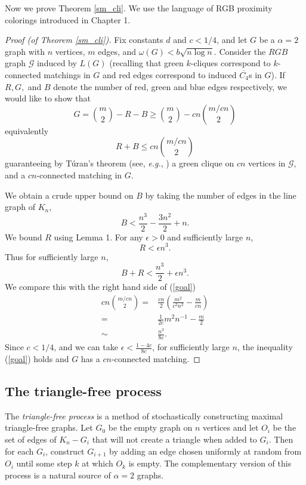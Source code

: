 Now we prove Theorem \ref{sm_cli}.  We use the language of RGB proximity colorings introduced in Chapter 1. 

\begin{proof}[Proof (of Theorem \ref{sm_cli})]
Fix constants $d$ and $c < 1/4$, and let $G$ be a $\alpha = 2$ graph with $n$ vertices, $m$ edges, and $\omega(G) < b\sqrt{n\log n}$.  
%
Consider the $RGB$ graph $\mathcal{G}$ induced by $L(G)$ (recalling that green $k$-cliques correspond to $k$-connected matchings in $G$ and red edges correspond to induced $\overline{C_4}$s in $G$).
%
If $R, G,$ and $B$ denote the number of red, green and blue edges respectively, we would like to show that 
\begin{equation}
G = {m\choose 2} - R - B \geq {m\choose 2} - cn{m/cn\choose 2}
\end{equation} equivalently
\begin{equation}
	R + B \leq cn{m/cn\choose 2}\label{goal}
\end{equation}
guaranteeing by T\'{u}ran's theorem (see, \textit{e.g.}, \cite{dwest}) a green clique on $cn$ vertices in $\mathcal{G}$, and a $cn$-connected matching in $G$.

We obtain a crude upper bound on $B$ by taking the number of edges in the line graph of $K_n$,
\begin{equation}
	B < \frac{n^3}{2} - \frac{3n^2}{2} + n.
\end{equation}
We bound $R$ using Lemma 1.  For any $\epsilon > 0$ and sufficiently large $n$, 
\begin{equation}
R < \epsilon n^3.
\end{equation}
Thus for sufficiently large $n$,
\begin{equation}
	B+R < \frac{n^3}{2} + \epsilon n^3.
\end{equation}
We compare this with the right hand side of (\ref{goal})
\begin{eqnarray}
	cn{m/cn\choose 2} =&\displaystyle \frac{cn}{2}\left(\frac{m^2}{c^2n^2} - \frac{m}{cn}\right)\\
	=& \displaystyle \frac{1}{2c}m^2n^{-1} - \frac{m}{2}\\
	\sim&   \displaystyle \frac{n^3}{8c}.
\end{eqnarray}
Since $c < 1/4$, and we can take $\epsilon < \frac{1-4c}{8c}$, for sufficiently large $n$, the inequality (\ref{goal}) holds and $G$ has a $cn$-connected matching.
\end{proof}

\subsection{The triangle-free process}
The \textit{triangle-free process} is a method of stochastically constructing maximal triangle-free graphs.  Let $G_0$ be the empty graph on $n$ vertices and let $O_i$ be the set of edges of $K_n- G_i$ that will not create a triangle when added to $G_i$.  Then for each $G_i$, construct $G_{i+1}$ by adding an edge chosen uniformly at random from $O_i$ until some step $k$ at which $O_k$ is empty.  The complementary version of this process is a natural source of $\alpha = 2$ graphs.  

